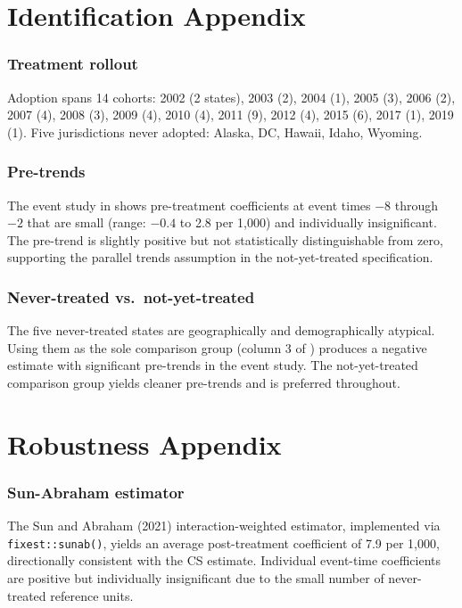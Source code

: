 \documentclass[12pt]{article}
\begin{document}
\section{Identification Appendix}

\subsubsection*{Treatment rollout} Adoption spans 14 cohorts: 2002 (2 states), 2003 (2), 2004 (1), 2005 (3), 2006 (2), 2007 (4), 2008 (3), 2009 (4), 2010 (4), 2011 (9), 2012 (4), 2015 (6), 2017 (1), 2019 (1). Five jurisdictions never adopted: Alaska, DC, Hawaii, Idaho, Wyoming.

\subsubsection*{Pre-trends} The event study in  shows pre-treatment coefficients at event times $-8$ through $-2$ that are small (range: $-0.4$ to 2.8 per 1,000) and individually insignificant. The pre-trend is slightly positive but not statistically distinguishable from zero, supporting the parallel trends assumption in the not-yet-treated specification.

\subsubsection*{Never-treated vs.\ not-yet-treated} The five never-treated states are geographically and demographically atypical. Using them as the sole comparison group (column 3 of ) produces a negative estimate with significant pre-trends in the event study. The not-yet-treated comparison group yields cleaner pre-trends and is preferred throughout.

\section{Robustness Appendix}

\subsubsection*{Sun-Abraham estimator} The Sun and Abraham (2021) interaction-weighted estimator, implemented via \texttt{fixest::sunab()}, yields an average post-treatment coefficient of 7.9 per 1,000, directionally consistent with the CS estimate. Individual event-time coefficients are positive but individually insignificant due to the small number of never-treated reference units.
\end{document}
